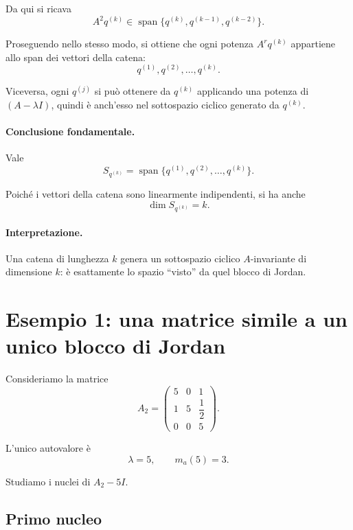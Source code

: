 Da qui si ricava
\[
A^2 q^{(k)} \in \operatorname{span}\{q^{(k)}, q^{(k-1)}, q^{(k-2)}\}.
\]

Proseguendo nello stesso modo, si ottiene che ogni potenza $A^r q^{(k)}$ appartiene allo span dei vettori della catena:
\[
q^{(1)}, q^{(2)}, \dots, q^{(k)}.
\]

Viceversa, ogni $q^{(j)}$ si può ottenere da $q^{(k)}$ applicando una potenza di $(A-\lambda I)$, quindi è anch'esso nel sottospazio ciclico generato da $q^{(k)}$.

\paragraph{Conclusione fondamentale.}
Vale
\begin{equation}
S_{q^{(k)}} = \operatorname{span}\{q^{(1)}, q^{(2)}, \dots, q^{(k)}\}.
\label{eq:L8_cyclic_chain}
\end{equation}

Poiché i vettori della catena sono linearmente indipendenti, si ha anche
\[
\dim S_{q^{(k)}} = k.
\]

\paragraph{Interpretazione.}
Una catena di lunghezza $k$ genera un sottospazio ciclico $A$-invariante di dimensione $k$: è esattamente lo spazio ``visto'' da quel blocco di Jordan.

\section{Esempio 1: una matrice simile a un unico blocco di Jordan}

Consideriamo la matrice
\begin{equation}
A_2 =
\begin{pmatrix}
5 & 0 & 1\\
1 & 5 & \dfrac12\\
0 & 0 & 5
\end{pmatrix}.
\label{eq:L8_A2}
\end{equation}

L'unico autovalore è
\[
\lambda = 5,
\qquad
m_a(5)=3.
\]

Studiamo i nuclei di $A_2 - 5I$.

\subsection*{Primo nucleo}

